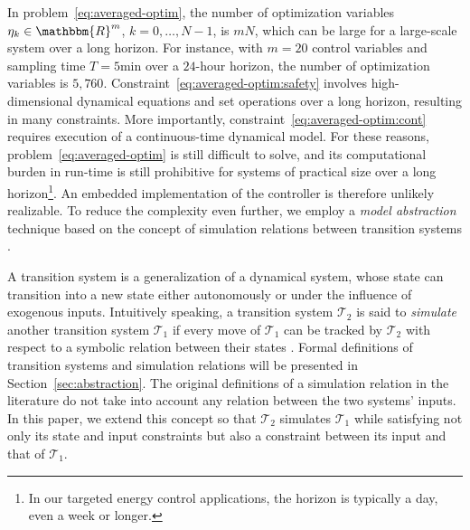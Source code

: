 In problem~\eqref{eq:averaged-optim}, the number of optimization variables $\eta_k \in \mathbbm{R}^m$, $k = 0, \ldots, N - 1$, is $mN$, which can be large for a large-scale system over a long horizon.
For instance, with $m=20$ control variables and sampling time $T = 5 \text{min}$ over a $24$-hour horizon, the number of optimization variables is $5 \comma 760$.
Constraint~\eqref{eq:averaged-optim:safety} involves high-dimensional dynamical equations and set operations over a long horizon, resulting in many constraints.
More importantly, constraint~\eqref{eq:averaged-optim:cont} requires execution of a continuous-time dynamical model.
For these reasons, problem~\eqref{eq:averaged-optim} is still difficult to solve, and its computational burden in run-time is still prohibitive for systems of practical size over a long horizon\footnote{In our targeted energy control applications, the horizon is typically a day, even a week or longer.}.
An embedded implementation of the controller is therefore unlikely realizable.
To reduce the complexity even further, we employ a \emph{model abstraction} technique based on the concept of simulation relations between transition systems \cite{aluretal00dah,girardetal07amd}.

A transition system is a generalization of a dynamical system, whose state can
transition into a new state either autonomously or under the influence of
exogenous inputs.
Intuitively speaking, a transition system $\mathcal{T}_2$ is said to {\emph{simulate}} another
transition system $\mathcal{T}_1$ if every move of $\mathcal{T}_1$ can be
tracked by $\mathcal{T}_2$ with respect to a symbolic relation between their states \cite{girardetal07amd}.
Formal definitions of transition systems and simulation relations will
be presented in Section~\ref{sec:abstraction}. The original definitions of a
simulation relation in the literature do not take into account %
any relation between the two systems' inputs.
In this paper, we extend this concept so that $\mathcal{T}_2$ simulates
$\mathcal{T}_1$ while satisfying not only its state and input constraints but also a constraint between its input and that of $\mathcal{T}_1$.

